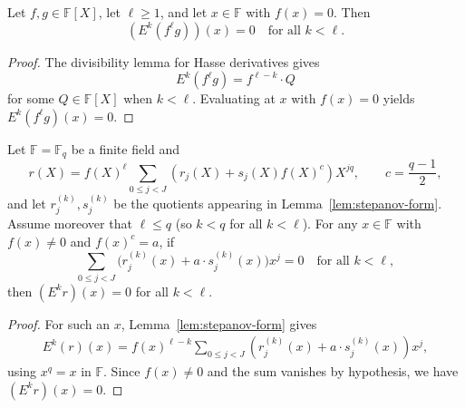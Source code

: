 \begin{lemma}\label{lem:stepanov-vanishing-roots} \leanok {}
  Let $f, g \in \mathbb{F}[X]$, let $\ell \ge 1$, and let $x \in \mathbb{F}$ with $f(x) = 0$. Then
  \[
    (E^k(f^\ell g))(x) = 0 \quad \text{for all } k < \ell.
  \]
\end{lemma}
\begin{proof} \leanok
  The divisibility lemma for Hasse derivatives gives
  \[
    E^k(f^\ell g) = f^{\ell-k} \cdot Q
  \]
  for some $Q \in \mathbb{F}[X]$ when $k < \ell$. Evaluating at $x$ with $f(x)=0$ yields
  $E^k(f^\ell g)(x) = 0$.
\end{proof}

\begin{lemma}\label{lem:stepanov-vanishing-nonzeros} \leanok {}
  Let $\mathbb{F} = \mathbb{F}_q$ be a finite field and
  \[
    r(X) = f(X)^\ell \sum_{0 \leq j < J} (r_j(X) + s_j(X) f(X)^c) X^{jq},
    \qquad c = \frac{q-1}{2},
  \]
  and let $r_j^{(k)}, s_j^{(k)}$ be the quotients appearing in Lemma~\ref{lem:stepanov-form}. Assume moreover that $\ell \le q$ (so $k < q$ for all $k < \ell$). For any $x \in \mathbb{F}$ with $f(x) \neq 0$ and $f(x)^c = a$, if
  \[
    \sum_{0 \leq j < J} \big(r_j^{(k)}(x) + a \cdot s_j^{(k)}(x)\big) x^j = 0
    \quad \text{for all } k < \ell,
  \]
  then $(E^k r)(x) = 0$ for all $k < \ell$.
\end{lemma}
\begin{proof} \leanok
  For such an $x$, Lemma~\ref{lem:stepanov-form} gives
  \begin{align*}
    E^k(r)(x) = f(x)^{\ell-k} \sum_{0 \leq j < J} (r_j^{(k)}(x) + a \cdot s_j^{(k)}(x)) x^j,
  \end{align*}
  using $x^q = x$ in $\mathbb{F}$.
  Since $f(x) \neq 0$ and the sum vanishes by hypothesis, we have $(E^k r)(x) = 0$.
\end{proof}

